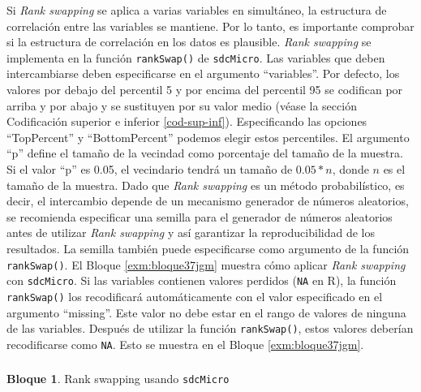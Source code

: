 \documentclass[]{book}
\newenvironment{Shaded}{\begin{snugshade}}{\end{snugshade}}
\newcommand{\CommentTok}[1]{\textcolor[rgb]{0.56,0.35,0.01}{\textit{#1}}}
\newcommand{\DecValTok}[1]{\textcolor[rgb]{0.00,0.00,0.81}{#1}}
\newcommand{\KeywordTok}[1]{\textcolor[rgb]{0.13,0.29,0.53}{\textbf{#1}}}
\newcommand{\NormalTok}[1]{#1}
\newcommand{\OperatorTok}[1]{\textcolor[rgb]{0.81,0.36,0.00}{\textbf{#1}}}
\theoremstyle{definition}
\theoremstyle{definition}
\newtheorem{example}{Bloque}[chapter]
\theoremstyle{definition}
\theoremstyle{definition}
\theoremstyle{remark}
\begin{document}
Si \emph{Rank swapping} se aplica a varias variables en simultáneo, la estructura de correlación entre las variables se mantiene. Por lo tanto, es importante comprobar si la estructura de correlación en los datos es plausible. \emph{Rank swapping} se implementa en la función \texttt{rankSwap()} de \texttt{sdcMicro}. Las variables que deben intercambiarse deben especificarse en el argumento ``variables''. Por defecto, los valores por debajo del percentil 5 y por encima del percentil 95 se codifican por arriba y por abajo y se sustituyen por su valor medio (véase la sección Codificación superior e inferior \ref{cod-sup-inf}). Especificando las opciones ``TopPercent'' y ``BottomPercent'' podemos elegir estos percentiles. El argumento ``p'' define el tamaño de la vecindad como porcentaje del tamaño de la muestra. Si el valor ``p'' es 0.05, el vecindario tendrá un tamaño de \(0.05 * n\), donde \(n\) es el tamaño de la muestra. Dado que \emph{Rank swapping} es un método probabilístico, es decir, el intercambio depende de un mecanismo generador de números aleatorios, se recomienda especificar una semilla para el generador de números aleatorios antes de utilizar \emph{Rank swapping} y así garantizar la reproducibilidad de los resultados. La semilla también puede especificarse como argumento de la función \texttt{rankSwap()}. El Bloque \ref{exm:bloque37jgm} muestra cómo aplicar \emph{Rank swapping} con \texttt{sdcMicro}. Si las variables contienen valores perdidos (\texttt{NA} en R), la función \texttt{rankSwap()} los recodificará automáticamente con el valor especificado en el argumento ``missing''. Este valor no debe estar en el rango de valores de ninguna de las variables. Después de utilizar la función \texttt{rankSwap()}, estos valores deberían recodificarse como \texttt{NA}. Esto se muestra en el Bloque \ref{exm:bloque37jgm}.

\hypertarget{section-11}{%
\subsubsection{}\label{section-11}}

\begin{example}
\protect\hypertarget{exm:bloque37jgm}{}{\label{exm:bloque37jgm} }Rank swapping usando \texttt{sdcMicro}
\end{example}

\begin{Shaded}
\end{Shaded}
\end{document}
